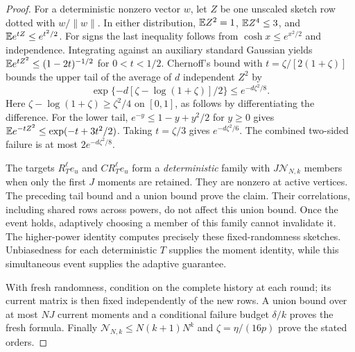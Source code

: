 \begin{proof}
For a deterministic nonzero vector $w$, let $Z$ be one
unscaled sketch row dotted with $w/\|w\|$. In either distribution,
$\mathbb E Z^2=1$, $\mathbb E Z^4\leq3$, and
$\mathbb E e^{tZ}\leq e^{t^2/2}$. For signs the last inequality follows
from $\cosh x\leq e^{x^2/2}$ and independence. Integrating
against an auxiliary standard Gaussian yields
$\mathbb E e^{tZ^2}\leq(1-2t)^{-1/2}$ for $0<t<1/2$.
Chernoff's bound with $t=\zeta/[2(1+\zeta)]$ bounds the upper
tail of the average of $d$ independent $Z^2$ by
\[
 \exp\{-d[\zeta-\log(1+\zeta)]/2\}
 \leq e^{-d\zeta^2/8}.
\]
Here $\zeta-\log(1+\zeta)\geq\zeta^2/4$ on $[0,1]$, as
follows by differentiating the difference.
For the lower tail, $e^{-y}\leq1-y+y^2/2$ for $y\geq0$
gives $\mathbb E e^{-tZ^2}\leq\exp(-t+3t^2/2)$.
Taking $t=\zeta/3$ gives $e^{-d\zeta^2/6}$.
The combined two-sided failure is at most $2e^{-d\zeta^2/8}$.

The targets $R_T^\ell e_u$ and $CR_T^\ell e_u$ form a
\emph{deterministic} family with $J\mathcal N_{N,k}$ members when only
the first $J$ moments are retained. They are nonzero at active
vertices. The preceding tail bound and a union bound prove the
claim. Their correlations, including shared rows across powers,
do not affect this union bound. Once the event holds, adaptively
choosing a member of this family cannot invalidate it.
The higher-power identity computes precisely these fixed-randomness
sketches. Unbiasedness for each deterministic $T$ supplies the
moment identity, while this simultaneous event supplies the
adaptive guarantee.

With fresh randomness, condition on the complete history at each
round; its current matrix is then fixed independently of the new
rows. A union bound over at most $NJ$ current moments and a
conditional failure budget $\delta/k$ proves the fresh formula.
Finally $\mathcal N_{N,k}\leq N(k+1)N^k$ and
$\zeta=\eta/(16p)$ prove the stated orders.
\end{proof}

